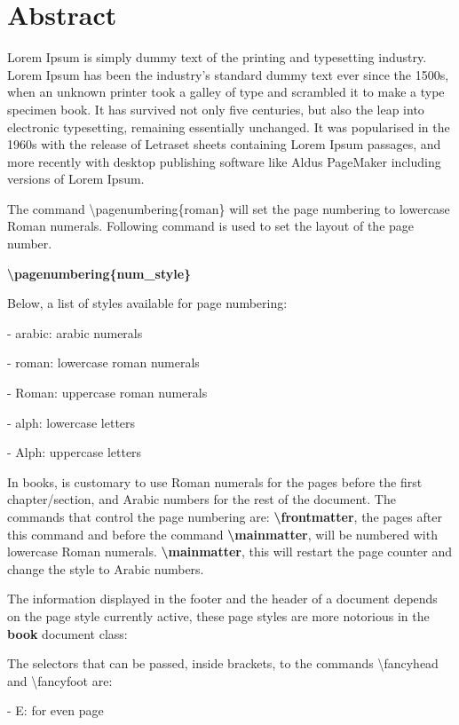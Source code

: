 \documentclass[a4paper,11pt,UTF8,openright]{book}
\begin{document}
\chapter*{Abstract}

Lorem Ipsum is simply dummy text of the printing and typesetting industry. Lorem Ipsum has been the industry's standard dummy text ever since the 1500s, when an unknown printer took a galley of type and scrambled it to make a type specimen book. It has survived not only five centuries, but also the leap into electronic typesetting, remaining essentially unchanged. It was popularised in the 1960s with the release of Letraset sheets containing Lorem Ipsum passages, and more recently with desktop publishing software like Aldus PageMaker including versions of Lorem Ipsum.~\cite{Weir04}

The command \textbackslash pagenumbering\{roman\} will set the page numbering to lowercase Roman numerals. Following command is used to set the layout of the page number.

\textbf{\textbackslash pagenumbering\{num\_style\}}

Below, a list of styles available for page numbering:

- arabic: arabic numerals

- roman: lowercase roman numerals

- Roman: uppercase roman numerals

- alph: lowercase letters

- Alph: uppercase letters

In books, is customary to use Roman numerals for the pages before the first chapter/section, and Arabic numbers for the rest of the document. The commands that control the page numbering are: \textbf{\textbackslash frontmatter}, the pages after this command and before the command \textbf{\textbackslash mainmatter}, will be numbered with lowercase Roman numerals. \textbf{\textbackslash mainmatter}, this will restart the page counter and change the style to Arabic numbers.

The information displayed in the footer and the header of a document depends on the page style currently active, these page styles are more notorious in the \textbf{book} document class:

The selectors that can be passed, inside brackets, to the commands \textbackslash fancyhead and \textbackslash fancyfoot are:

- E: for even page
\end{document}
